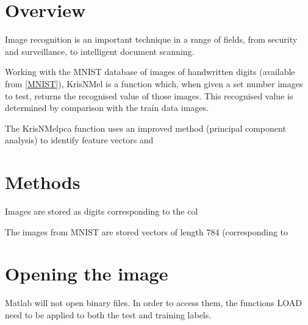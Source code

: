\documentclass[12pt]{article}
\begin{document}
\section{Overview}

Image recognition is an important technique in a range of fields, from security and surveillance, to intelligent document scanning. 

Working with the MNIST database of images of handwritten digits (available from \ref{MNIST}), KrisNMel is a function which, when given a set number images to test, returns the recognised value of those images. This recognised value is determined by comparison with the train data images. 

The KrisNMelpca function uses an improved method (principal component analysis) to identify feature vectors and 

\section{Methods}

Images are stored as digits corresponding to the col

The images from MNIST are stored vectors of length 784 (corresponding to 

\section{Opening the image}

Matlab will not open binary files. In order to access them, the functions LOAD need to be applied to both the test and training labels. 
\end{document}
